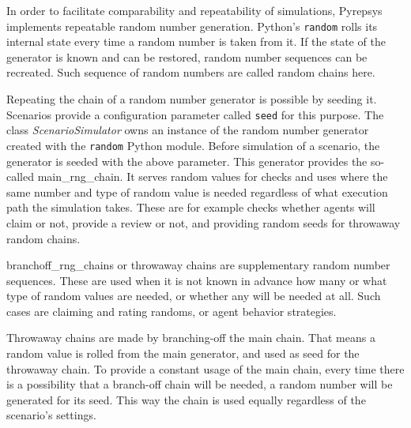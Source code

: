 \documentclass[%
    ]{\PathToTumTemplate/thesis/tum_thesis}
\begin{document}
In order to facilitate comparability and repeatability of simulations, Pyrepsys implements repeatable random number generation.
Python's \lstinline{random} rolls its internal state every time a random number is taken from it.
If the state of the generator is known and can be restored, random number sequences can be recreated.
Such sequence of random numbers are called random chains here.

Repeating the chain of a random number generator is possible by seeding it.
Scenarios provide a configuration parameter called \lstinline{seed} for this purpose.
The class \emph{ScenarioSimulator} owns an instance of the random number generator created with the \lstinline{random} Python module.
Before simulation of a scenario, the generator is seeded with the above parameter.
This generator provides the so-called \gls{main_rng_chain}.
It serves random values for checks and uses where the same number and type of random value is needed regardless of what execution path the simulation takes.
These are for example checks whether agents will claim or not, provide a review or not, and providing random seeds for throwaway random chains.

\Glspl{branchoff_rng_chain} or throwaway chains are supplementary random number sequences.
These are used when it is not known in advance how many or what type of random values are needed, or whether any will be needed at all.
Such cases are claiming and rating randoms, or agent behavior strategies.

Throwaway chains are made by branching-off the main chain.
That means a random value is rolled from the main generator, and used as seed for the throwaway chain.
To provide a constant usage of the main chain, every time there is a possibility that a branch-off chain will be needed, a random number will be generated for its seed.
This way the chain is used equally regardless of the scenario's settings.
\end{document}
